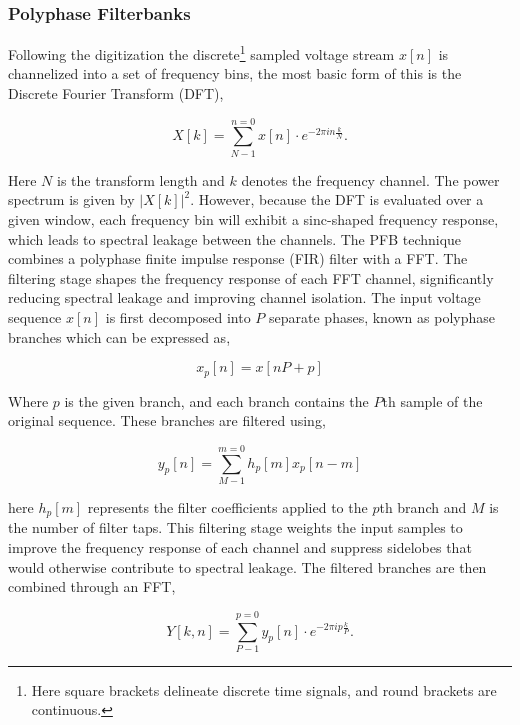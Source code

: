 \subsubsection{Polyphase Filterbanks} \label{sec:polyphase_theory}

Following the digitization the discrete\footnote{Here square brackets delineate discrete time signals, and round brackets are continuous. } sampled voltage stream $x[n]$ is channelized into a set of frequency bins, the most basic form of this is the Discrete Fourier Transform (DFT), 

\begin{equation}
    X[k] = \sum_{N-1}^{n=0} x[n] \cdot e^{-2 \pi i n \frac{k}{N}}.
\end{equation}

Here $N$ is the transform length and $k$ denotes the frequency channel. The power spectrum is given by $|X[k]|^2$. However, because the DFT is evaluated over a given window, each frequency bin will exhibit a sinc-shaped frequency response, which leads to spectral leakage between the channels. The PFB technique combines a polyphase finite impulse response (FIR) filter with a FFT. The filtering stage shapes the frequency response of each FFT channel, significantly reducing spectral leakage and improving channel isolation. The input voltage sequence $x[n]$ is first decomposed into $P$ separate phases, known as polyphase branches which can be expressed as,

\begin{equation}
    x_p[n]= x[nP+p]
\end{equation}

Where $p$ is the given branch, and each branch contains the $P$th sample of the original sequence. These branches are filtered using, 

\begin{equation}
    y_p [n] = \sum_{M - 1}^{m = 0} h_p [m] x_p [n-m]
\end{equation}

here $h_p[m]$ represents the filter coefficients applied to the $p$th branch and $M$ is the number of filter taps. This filtering stage weights the input samples to improve the frequency response of each channel and suppress sidelobes that would otherwise contribute to spectral leakage. The filtered branches are then combined through an FFT,

\begin{equation}
    Y[k,n] = \sum_{P - 1}^{p = 0} y_p [n] \cdot e^{-2 \pi i p \frac{k}{P}}. 
\end{equation}

